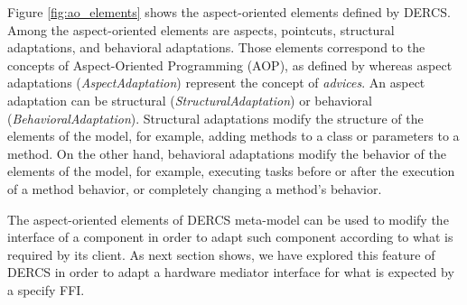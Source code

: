 
Figure \ref{fig:ao_elements} shows the aspect-oriented elements
defined by DERCS.
Among the aspect-oriented elements are aspects, pointcuts,
structural adaptations, and behavioral adaptations.
Those elements correspond to the concepts of Aspect-Oriented Programming (AOP),
as defined by \cite{Kiczales:1997} whereas
aspect adaptations (\emph{AspectAdaptation})
represent the concept of \emph{advices}.
An aspect adaptation can be structural (\emph{StructuralAdaptation}) or
behavioral (\emph{BehavioralAdaptation}).
Structural adaptations modify the structure of the elements of the model, for
example, adding methods to a class or parameters to a method.
On the other hand, behavioral adaptations modify the behavior of the elements of
the model, for example, executing tasks before or after the execution of a
method behavior, or completely changing a method's behavior.


The aspect-oriented elements of DERCS meta-model can be used to modify the
interface of a component in order to adapt such component according to what is
required by its client.
As next section shows, we have explored this feature of DERCS in order to
adapt a hardware mediator interface for what is expected by a specify FFI.


